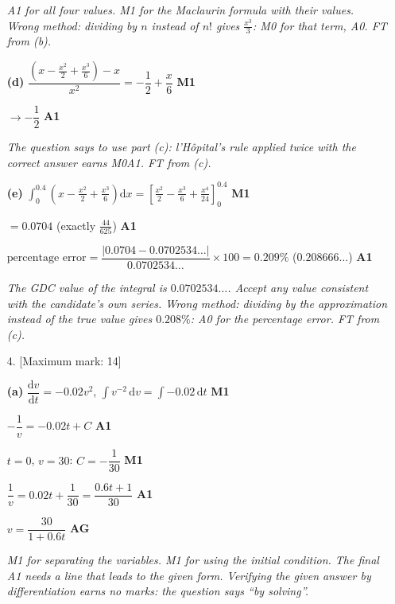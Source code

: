 \documentclass[12pt, twoside]{article}
\begin{document}
\begin{enumerate}[itemsep=0.3cm]
\emph{A1 for all four values. M1 for the Maclaurin formula with their
values. Wrong method: dividing by $n$ instead of $n!$ gives
$\frac{x^{3}}{3}$: M0 for that term, A0. FT from (b).}

\textbf{(d)} $\dfrac{\left(x - \frac{x^{2}}{2} + \frac{x^{3}}{6}\right) - x}{x^{2}} = -\dfrac{1}{2} + \dfrac{x}{6}$ \hfill \textbf{M1}

$\to -\dfrac{1}{2}$ \hfill \textbf{A1}

\emph{The question says to use part (c): l'H\^opital's rule applied twice
with the correct answer earns M0A1. FT from (c).}

\textbf{(e)} $\displaystyle\int_{0}^{0.4}\left(x - \frac{x^{2}}{2} + \frac{x^{3}}{6}\right)\mathrm{d}x = \left[\frac{x^{2}}{2} - \frac{x^{3}}{6} + \frac{x^{4}}{24}\right]_{0}^{0.4}$ \hfill \textbf{M1}

$= 0.0704$ \quad (exactly $\frac{44}{625}$) \hfill \textbf{A1}

$\text{percentage error} = \dfrac{|0.0704 - 0.0702534\ldots|}{0.0702534\ldots} \times 100 = 0.209\%$ \quad ($0.208666\ldots$) \hfill \textbf{A1}

\emph{The GDC value of the integral is $0.0702534\ldots$. Accept any value
consistent with the candidate's own series. Wrong method: dividing by the
approximation instead of the true value gives $0.208\%$: A0 for the
percentage error. FT from (c).}

\newpage

\item[4.] [Maximum mark: 14]

\textbf{(a)} $\dfrac{\mathrm{d}v}{\mathrm{d}t} = -0.02v^{2}$, \quad $\displaystyle\int v^{-2}\,\mathrm{d}v = \int -0.02\,\mathrm{d}t$ \hfill \textbf{M1}

$-\dfrac{1}{v} = -0.02t + C$ \hfill \textbf{A1}

$t = 0$, $v = 30$: \quad $C = -\dfrac{1}{30}$ \hfill \textbf{M1}

$\dfrac{1}{v} = 0.02t + \dfrac{1}{30} = \dfrac{0.6t + 1}{30}$ \hfill \textbf{A1}

$v = \dfrac{30}{1 + 0.6t}$ \hfill \textbf{AG}

\emph{M1 for separating the variables. M1 for using the initial
condition. The final A1 needs a line that leads to the given form.
Verifying the given answer by differentiation earns no marks: the
question says ``by solving''.}


\end{enumerate}
\end{document}
